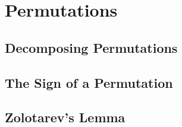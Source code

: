 \chapter{Permutations}

\section{Decomposing Permutations}

\section{The Sign of a Permutation}

\section{Zolotarev's Lemma}

